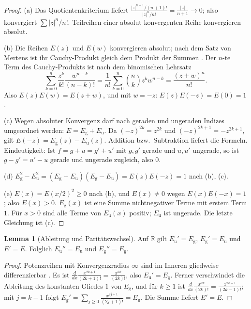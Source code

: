 \documentclass[a4paper,12pt,twoside]{report}
\theoremstyle{definition}
\newtheorem{lemma}{Lemma}
\begin{document}
\begin{proof}
(a) Das Quotientenkriterium liefert $\frac{|z|^{n+1}/(n+1)!}{|z|^n/n!}=\frac{|z|}{n+1}\to0$; also konvergiert $\sum|z|^n/n!$. Teilreihen einer absolut konvergenten Reihe konvergieren absolut.

(b) Die Reihen $E(z)$ und $E(w)$ konvergieren absolut; nach dem Satz von Mertens ist ihr Cauchy-Produkt gleich dem Produkt der Summen \cite{rudin_analysis}. Der $n$-te Term des Cauchy-Produkts ist nach dem binomischen Lehrsatz
\[
\sum_{k=0}^{n}\frac{z^k}{k!}\frac{w^{n-k}}{(n-k)!}=\frac1{n!}\sum_{k=0}^n\binom nk z^kw^{n-k}=\frac{(z+w)^n}{n!}.
\]
Also $E(z)E(w)=E(z+w)$, und mit $w=-z$: $E(z)E(-z)=E(0)=1$.

(c) Wegen absoluter Konvergenz darf nach geraden und ungeraden Indizes umgeordnet werden: $E=E_{\mathrm g}+E_{\mathrm u}$. Da $(-z)^{2k}=z^{2k}$ und $(-z)^{2k+1}=-z^{2k+1}$, gilt $E(-z)=E_{\mathrm g}(z)-E_{\mathrm u}(z)$. Addition bzw.\ Subtraktion liefert die Formeln. Eindeutigkeit: Ist $f=g+u=g'+u'$ mit $g,g'$ gerade und $u,u'$ ungerade, so ist $g-g'=u'-u$ gerade und ungerade zugleich, also $0$.

(d) $E_{\mathrm g}^2-E_{\mathrm u}^2=(E_{\mathrm g}+E_{\mathrm u})(E_{\mathrm g}-E_{\mathrm u})=E(z)E(-z)=1$ nach (b), (c).

(e) $E(x)=E(x/2)^2\ge0$ nach (b), und $E(x)\ne0$ wegen $E(x)E(-x)=1$; also $E(x)>0$. $E_{\mathrm g}(x)$ ist eine Summe nichtnegativer Terme mit erstem Term $1$. Für $x>0$ sind alle Terme von $E_{\mathrm u}(x)$ positiv; $E_{\mathrm u}$ ist ungerade. Die letzte Gleichung ist (c).
\end{proof}

\begin{lemma}[Ableitung und Paritätswechsel]\label{lem:ug:abl}
Auf $\mathbb{R}$ gilt $E_{\mathrm u}'=E_{\mathrm g}$, $E_{\mathrm g}'=E_{\mathrm u}$ und $E'=E$. Folglich $E_{\mathrm u}''=E_{\mathrm u}$ und $E_{\mathrm g}''=E_{\mathrm g}$.
\end{lemma}

\begin{proof}
Potenzreihen mit Konvergenzradius $\infty$ sind im Inneren gliedweise differenzierbar \cite{rudin_analysis}. Es ist $\frac{d}{dx}\frac{x^{2k+1}}{(2k+1)!}=\frac{x^{2k}}{(2k)!}$, also $E_{\mathrm u}'=E_{\mathrm g}$. Ferner verschwindet die Ableitung des konstanten Gliedes $1$ von $E_{\mathrm g}$, und für $k\ge1$ ist $\frac{d}{dx}\frac{x^{2k}}{(2k)!}=\frac{x^{2k-1}}{(2k-1)!}$; mit $j=k-1$ folgt $E_{\mathrm g}'=\sum_{j\ge0}\frac{x^{2j+1}}{(2j+1)!}=E_{\mathrm u}$. Die Summe liefert $E'=E$.
\end{proof}
\end{document}
